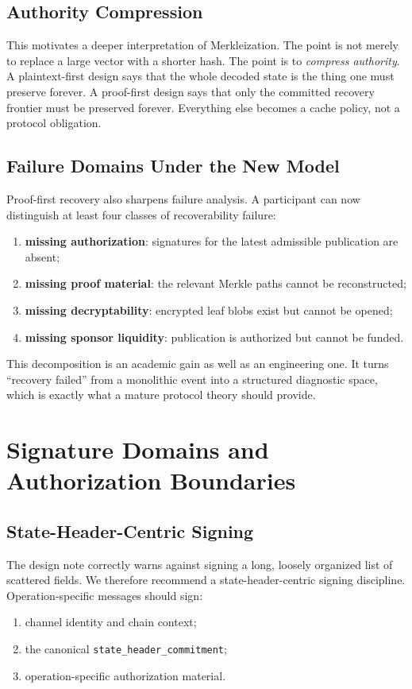 \documentclass[11pt,a4paper]{article}
\newcommand{\code}[1]{\texttt{#1}}
\begin{document}
\subsection{Authority Compression}

This motivates a deeper interpretation of Merkleization. The point is not merely to replace a large vector with a shorter hash. The point is to \emph{compress authority}. A plaintext-first design says that the whole decoded state is the thing one must preserve forever. A proof-first design says that only the committed recovery frontier must be preserved forever. Everything else becomes a cache policy, not a protocol obligation.

\subsection{Failure Domains Under the New Model}

Proof-first recovery also sharpens failure analysis. A participant can now distinguish at least four classes of recoverability failure:
\begin{enumerate}
    \item \textbf{missing authorization}: signatures for the latest admissible publication are absent;
    \item \textbf{missing proof material}: the relevant Merkle paths cannot be reconstructed;
    \item \textbf{missing decryptability}: encrypted leaf blobs exist but cannot be opened;
    \item \textbf{missing sponsor liquidity}: publication is authorized but cannot be funded.
\end{enumerate}

This decomposition is an academic gain as well as an engineering one. It turns ``recovery failed'' from a monolithic event into a structured diagnostic space, which is exactly what a mature protocol theory should provide.

\section{Signature Domains and Authorization Boundaries}

\subsection{State-Header-Centric Signing}

The design note correctly warns against signing a long, loosely organized list of scattered fields. We therefore recommend a state-header-centric signing discipline. Operation-specific messages should sign:
\begin{enumerate}
    \item channel identity and chain context;
    \item the canonical \code{state\_header\_commitment};
    \item operation-specific authorization material.
\end{enumerate}
\end{document}
